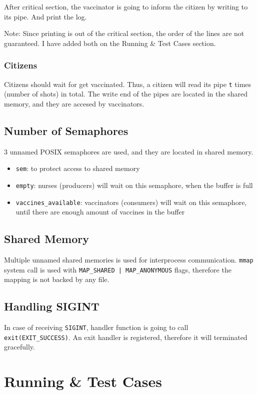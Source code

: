 \documentclass[a4paper]{article}
\begin{document}
After critical section, the vaccinator is going to inform the citizen by writing to its pipe. And print the log.

Note: Since printing is out of the critical section, the order of the lines are not guaranteed. I have added both on the Running \& Test Cases section.
\subsubsection{Citizens}
\label{sec:org207eaba}
Citizens should wait for get vaccinated. Thus, a citizen will read its pipe \texttt{t} times (number of shots) in total. The write end of the pipes are located in the shared memory, and they are accesed by vaccinators.

\newpage

\subsection{Number of Semaphores}
\label{sec:org22e9237}
3 unnamed POSIX semaphores are used, and they are located in shared memory.
\begin{itemize}
\item \texttt{sem}: to protect access to shared memory
\item \texttt{empty}: nurses (producers) will wait on this semaphore, when the buffer is full
\item \texttt{vaccines\_available}: vaccinators (consumers) will wait on this semaphore, until there are enough amount of vaccines in the buffer
\end{itemize}

\subsection{Shared Memory}
\label{sec:orgd862a9c}
Multiple unnamed shared memories is used for interprocess communication.  \texttt{mmap} system call is used with \texttt{MAP\_SHARED | MAP\_ANONYMOUS} flags, therefore the mapping is not backed by any file.

\subsection{Handling SIGINT}
\label{sec:org42d912d}
In case of receiving \texttt{SIGINT}, handler function is going to call \texttt{exit(EXIT\_SUCCESS)}. An exit handler is registered, therefore it will terminated gracefully.

\section{Running \& Test Cases}
\label{sec:org6d58fe7}
\end{document}
